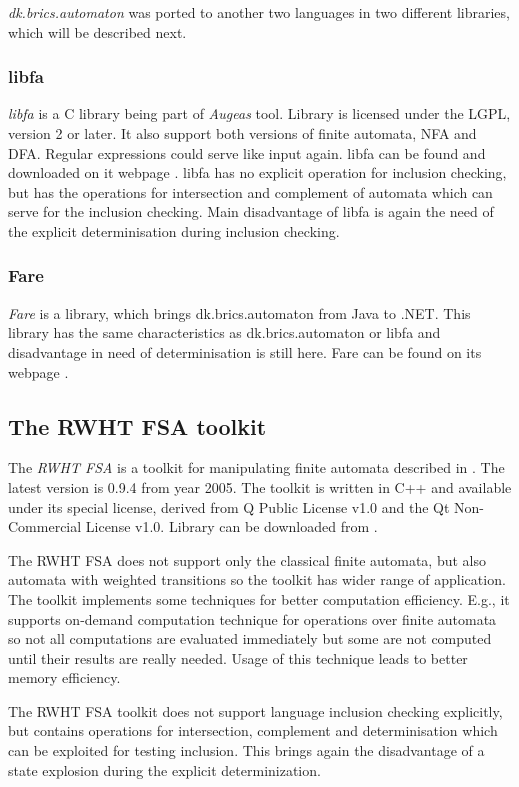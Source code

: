 \emph{dk.brics.automaton} was ported to another two languages in two different libraries, which will be described next.

\subsubsection{libfa}
\emph{libfa} is a C library being part of \emph{Augeas} tool. 
Library is licensed under the LGPL, version 2 or later. It also support both versions of finite automata, NFA and DFA. 
Regular expressions could serve like input again.
libfa can be found and downloaded on it webpage \cite{libfa}.
libfa has no explicit operation for inclusion checking, but has the operations for intersection and complement of automata
which can serve for the inclusion checking.
Main disadvantage of libfa is again the need of the explicit determinisation during inclusion checking.

\subsubsection{Fare}
\emph{Fare} is a library, which brings dk.brics.automaton from Java to .NET. 
This library has the same characteristics as dk.brics.automaton or libfa and disadvantage in need of determinisation is still here. 
Fare can be found on its webpage \cite{fare}.

\subsection{The RWHT FSA toolkit}
The \emph{RWHT FSA} is a toolkit for manipulating finite automata described in \cite{kanthakN04}. 
The latest version is 0.9.4 from year 2005. The toolkit is written in C++
and available under its special license, derived from Q Public License v1.0 and the Qt Non-Commercial License v1.0. Library can be downloaded from \cite{rwth}. 

The RWHT FSA does not support only the classical finite automata, but also automata with weighted transitions so the toolkit has wider range of application.
The toolkit implements some techniques for better computation efficiency. E.g., it supports on-demand computation technique for operations over finite automata 
so not all computations are evaluated immediately but some are not computed until their results are really
needed. Usage of this technique leads to better memory efficiency. 

The RWHT FSA toolkit does not support language inclusion checking explicitly, but contains operations for intersection, complement and
determinisation which can be exploited for testing inclusion. This brings again the disadvantage of a state explosion during 
the explicit determinization. 

